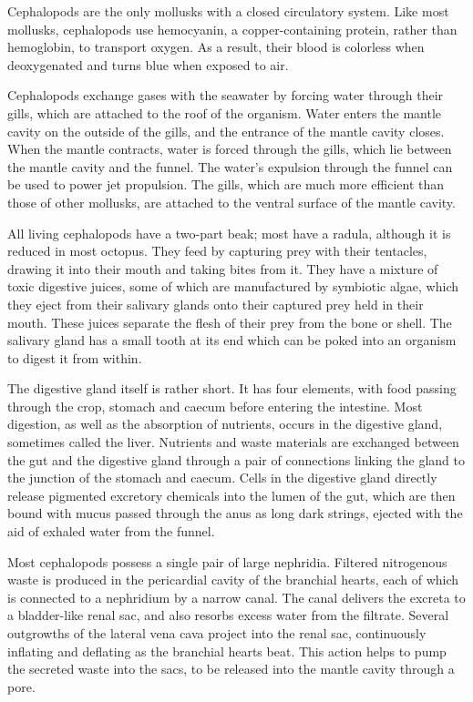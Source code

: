 Cephalopods are the only mollusks with a closed circulatory system. Like
most mollusks, cephalopods use hemocyanin, a copper-containing protein,
rather than hemoglobin, to transport oxygen. As a result, their blood is
colorless when deoxygenated and turns blue when exposed to air.

Cephalopods exchange gases with the seawater by forcing water through
their gills, which are attached to the roof of the organism. Water
enters the mantle cavity on the outside of the gills, and the entrance
of the mantle cavity closes. When the mantle contracts, water is forced
through the gills, which lie between the mantle cavity and the funnel.
The water's expulsion through the funnel can be used to power jet
propulsion. The gills, which are much more efficient than those of other
mollusks, are attached to the ventral surface of the mantle cavity.

All living cephalopods have a two-part beak; most have a radula,
although it is reduced in most octopus. They feed by capturing prey with
their tentacles, drawing it into their mouth and taking bites from it.
They have a mixture of toxic digestive juices, some of which are
manufactured by symbiotic algae, which they eject from their salivary
glands onto their captured prey held in their mouth. These juices
separate the flesh of their prey from the bone or shell. The salivary
gland has a small tooth at its end which can be poked into an organism
to digest it from within.

The digestive gland itself is rather short. It has four elements, with
food passing through the crop, stomach and caecum before entering the
intestine. Most digestion, as well as the absorption of nutrients,
occurs in the digestive gland, sometimes called the liver. Nutrients and
waste materials are exchanged between the gut and the digestive gland
through a pair of connections linking the gland to the junction of the
stomach and caecum. Cells in the digestive gland directly release
pigmented excretory chemicals into the lumen of the gut, which are then
bound with mucus passed through the anus as long dark strings, ejected
with the aid of exhaled water from the funnel.

Most cephalopods possess a single pair of large nephridia. Filtered
nitrogenous waste is produced in the pericardial cavity of the branchial
hearts, each of which is connected to a nephridium by a narrow canal.
The canal delivers the excreta to a bladder-like renal sac, and also
resorbs excess water from the filtrate. Several outgrowths of the
lateral vena cava project into the renal sac, continuously inflating and
deflating as the branchial hearts beat. This action helps to pump the
secreted waste into the sacs, to be released into the mantle cavity
through a pore.

